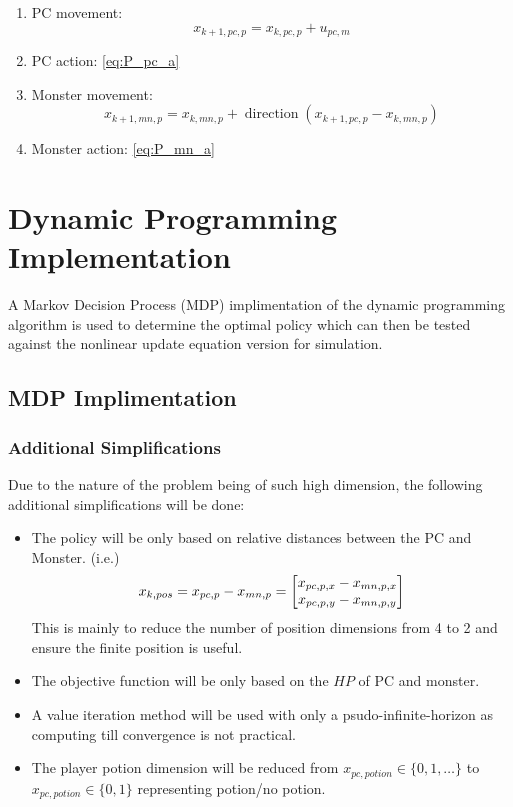 \documentclass[letterpaper, 10 pt, conference]{ieeeconf}
\begin{document}
\begin{enumerate}
    \item PC movement: \[
        x_{k+1,pc,p} = x_{k,pc,p} + u_{pc,m}
    \]
    \item PC action: \eqref{eq:P_pc_a}
    \item Monster movement: \[
        x_{k+1,mn,p} = x_{k,mn,p} + \operatorname{direction}(x_{k+1,pc,p} - x_{k,mn,p})
    \]
    \item Monster action: \eqref{eq:P_mn_a}
\end{enumerate}

\section{Dynamic Programming Implementation}
A Markov Decision Process (MDP) implimentation of the dynamic programming algorithm is used to determine the optimal policy which can then be tested against the nonlinear update equation version for simulation.

\subsection{MDP Implimentation}
\subsubsection{Additional Simplifications}
Due to the nature of the problem being of such high dimension, the following additional simplifications will be done:
\begin{itemize}
    \item The policy will be only based on relative distances between the PC and Monster. (i.e.) \[
        x_{k,pos} = x_{pc,p} - x_{mn,p} = \mqty[x_{pc,p,x} - x_{mn,p,x}\\ x_{pc,p,y} - x_{mn,p,y}]
    \]
    This is mainly to reduce the number of position dimensions from 4 to 2 and ensure the finite position is useful.
    \item The objective function will be only based on the $HP$ of PC and monster.
    \item A value iteration method will be used with only a psudo-infinite-horizon as computing till convergence is not practical.
    \item The player potion dimension will be reduced from $x_{pc,potion} \in \{0,1,\dots\}$ to $x_{pc,potion} \in \{0,1\}$ representing potion/no potion.
\end{itemize}
\end{document}
